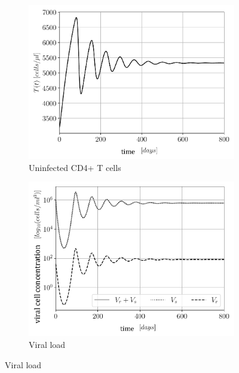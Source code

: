 \begin{figure}
    \centering
    \begin{subfigure}[b]{0.475\textwidth}
        \centering
        \includegraphics[width=\textwidth]{images/eRT_04_alpha_02/treated_T.pdf}
        \caption[]%
        {{\small Uninfected CD4+ T cells}}    
        \label{fig2a:uninfected_T_cells}
    \end{subfigure}
    \begin{subfigure}[b]{0.475\textwidth}   
        \centering 
        \includegraphics[width=\textwidth]{images/eRT_04_alpha_02/treated_overview_V.pdf}
        \caption[]%
        {{\small Viral load}}    
        \label{fig2c:viral_load}
    \end{subfigure}

\end{figure}
